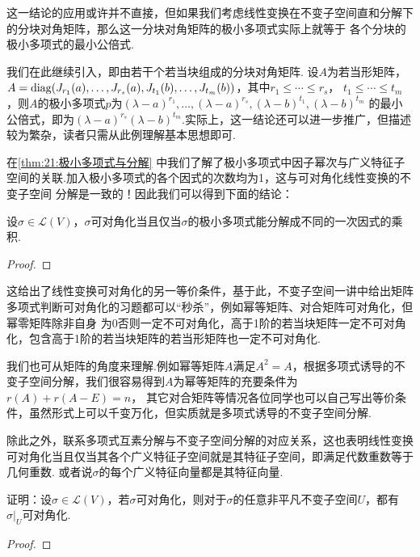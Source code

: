 这一结论的应用或许并不直接，但如果我们考虑线性变换在不变子空间直和分解下的分块对角矩阵，那么这一分块对角矩阵的极小多项式实际上就等于
各个分块的极小多项式的最小公倍式.
\begin{example} \label{thm:21:若当形矩阵极小多项式}
    我们在此继续引入，即由若干个若当块组成的分块对角矩阵. 设$A$为若当形矩阵，
    $A=\operatorname{diag}(J_{r_1}(a),\ldots,J_{r_s}(a),J_{t_1}(b),\ldots,J_{t_m}(b))$，其中$r_1\leqslant\cdots\leqslant r_s$，
    $t_1\leqslant\cdots\leqslant t_m$，则$A$的极小多项式$p$为$(\lambda-a)^{r_1},\ldots,(\lambda-a)^{r_s},(\lambda-b)^{t_1},(\lambda-b)^{t_m}$
    的最小公倍式，即为$(\lambda-a)^{r_s}(\lambda-b)^{t_m}$.实际上，这一结论还可以进一步推广，但描述较为繁杂，读者只需从此例理解基本思想即可.
\end{example}
在\autoref{thm:21:极小多项式与分解} 中我们了解了极小多项式中因子幂次与广义特征子空间的关联.加入极小多项式的各个因式的次数均为1，这与可对角化线性变换的不变子空间
分解是一致的！因此我们可以得到下面的结论：
\begin{theorem}
    设$\sigma\in \mathcal{L}(V)$，$\sigma$可对角化当且仅当$\sigma$的极小多项式能分解成不同的一次因式的乘积.
\end{theorem}
\begin{proof}
    
\end{proof}

这给出了线性变换可对角化的另一等价条件，基于此，不变子空间一讲中给出矩阵多项式判断可对角化的习题都可以``秒杀''，例如幂等矩阵、对合矩阵可对角化，但幂零矩阵除非自身
为0否则一定不可对角化，高于1阶的若当块矩阵一定不可对角化，包含高于1阶的若当块矩阵的若当形矩阵也一定不可对角化.

我们也可从矩阵的角度来理解.例如幂等矩阵$A$满足$A^2=A$，根据多项式诱导的不变子空间分解，我们很容易得到$A$为幂等矩阵的充要条件为$r(A)+r(A-E)=n$，
其它对合矩阵等情况各位同学也可以自己写出等价条件，虽然形式上可以千变万化，但实质就是多项式诱导的不变子空间分解.

除此之外，联系多项式互素分解与不变子空间分解的对应关系，这也表明线性变换可对角化当且仅当其各个广义特征子空间就是其特征子空间，即满足代数重数等于几何重数.
或者说$\sigma$的每个广义特征向量都是其特征向量.
\begin{example}
    证明：设$\sigma\in \mathcal{L}(V)$，若$\sigma$可对角化，则对于$\sigma$的任意非平凡不变子空间$U$，都有$\sigma\vert_U$可对角化.
\end{example}
\begin{proof}
    
\end{proof}

